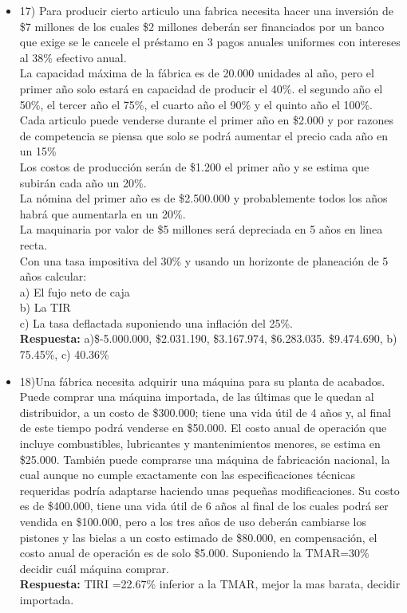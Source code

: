 \begin{itemize}
	\item 17)	Para producir cierto articulo una fabrica necesita hacer una inversión de \$7 millones de los cuales \$2 millones deberán ser financiados por un banco que exige se le cancele el préstamo en 3 pagos anuales uniformes con intereses al 38\% efectivo anual.\\
	      La capacidad máxima de la fábrica es de 20.000 unidades al año, pero el primer año solo estará en capacidad de producir el 40\%. el segundo año el 50\%, el tercer año
	      el 75\%, el cuarto año el 90\% y el quinto año el 100\%.\\
	      Cada articulo puede venderse durante el primer año en \$2.000 y por razones de competencia se piensa que solo se podrá aumentar el precio cada año en un 15\%\\
	      Los costos de producción serán de \$1.200 el primer año y se estima que subirán cada año un 20\%.\\
	      La nómina del primer año es de \$2.500.000 y probablemente todos los años habrá que aumentarla en un 20\%.\\
	      La maquinaria por valor de \$5 millones será depreciada en 5 años en linea recta.\\
	      Con una tasa impositiva del 30\% y usando un horizonte de planeación de 5 años calcular:\\
	      a) El fujo neto de caja\\
	      b) La TIR\\
	      c) La tasa deflactada suponiendo una inflación del 25\%.\\
	      \textbf{Respuesta:} a)\$-5.000.000, \$2.031.190, \$3.167.974, \$6.283.035. \$9.474.690, b) 75.45\%, c) 40.36\%
	      \medskip
	      
	\item 18)Una fábrica necesita adquirir una máquina para su planta de acabados. Puede comprar una máquina importada, de las últimas que le quedan al distribuidor, a un costo de \$300.000; tiene una vida útil de 4 años y, al final de este tiempo podrá venderse en \$50.000. El costo anual de operación que incluye combustibles, lubricantes y mantenimientos menores, se estima en \$25.000. También puede comprarse una máquina de fabricación nacional, la cual aunque no cumple exactamente con las especificaciones técnicas requeridas podría adaptarse haciendo unas pequeñas modificaciones. Su costo es de \$400.000, tiene una vida útil de 6 años al final de los cuales podrá ser vendida en \$100.000, pero a los tres años de uso deberán cambiarse los pistones y las bielas a un costo estimado de \$80.000, en compensación, el costo anual de operación es de solo \$5.000. Suponiendo la TMAR=30\% decidir cuál máquina comprar.\\
	      \textbf{Respuesta:} TIRI =22.67\% inferior a la TMAR, mejor la mas barata, decidir importada.
	      \medskip
	      

\end{itemize}

